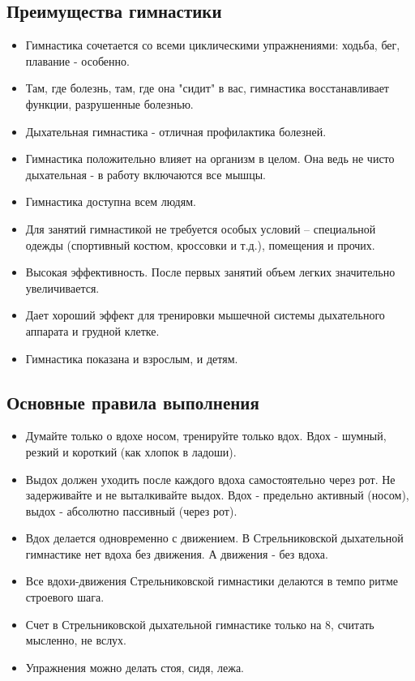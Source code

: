 \documentclass[a4paper]{article}
\begin{document}
    \subsection{Преимущества гимнастики}
    \begin{itemize}
        \item Гимнастика сочетается со всеми циклическими упражнениями: ходьба, бег, плавание - особенно.
        \item Там, где болезнь, там, где она "сидит" в вас, гимнастика восстанавливает функции, разрушенные болезнью.
        \item Дыхательная гимнастика - отличная профилактика болезней.
        \item Гимнастика положительно влияет на организм в целом. Она ведь не чисто дыхательная - в работу включаются все мышцы.
        \item Гимнастика доступна всем людям.
        \item Для занятий гимнастикой не требуется особых условий – специальной одежды (спортивный костюм, кроссовки и т.д.), помещения и прочих.
        \item Высокая эффективность. После первых занятий объем легких значительно увеличивается.
        \item Дает хороший эффект для тренировки мышечной системы дыхательного аппарата и грудной клетке.
        \item Гимнастика показана и взрослым, и детям.
    \end{itemize}

    \subsection{Основные правила выполнения}
    \begin{itemize}
        \item Думайте только о вдохе носом, тренируйте только вдох. Вдох - шумный, резкий и короткий (как хлопок в ладоши).
        \item Выдох должен уходить после каждого вдоха самостоятельно через рот. Не задерживайте и не выталкивайте выдох. Вдох - предельно активный (носом), выдох - абсолютно пассивный (через рот).
        \item Вдох делается одновременно с движением. В Стрельниковской дыхательной гимнастике нет вдоха без движения. А движения - без вдоха.
        \item Все вдохи-движения Стрельниковской гимнастики делаются в темпо ритме строевого шага.
        \item Счет в Стрельниковской дыхательной гимнастике только на 8, считать мысленно, не вслух.
        \item Упражнения можно делать стоя, сидя, лежа.
    \end{itemize}
\end{document}
